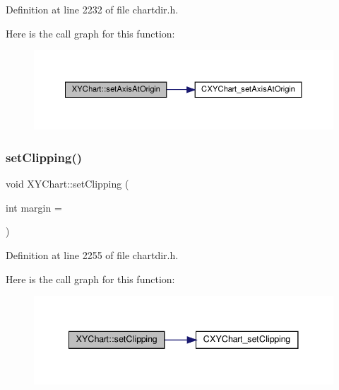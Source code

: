 Definition at line 2232 of file chartdir.\+h.

Here is the call graph for this function\+:
\nopagebreak
\begin{figure}[H]
\begin{center}
\leavevmode
\includegraphics[width=350pt]{class_x_y_chart_af108637af88e17464fbd2e675c03964f_cgraph}
\end{center}
\end{figure}
\mbox{\label{class_x_y_chart_a80c59b10a22fc74334a0e31945b05511}} 
\subsubsection{\texorpdfstring{set\+Clipping()}{setClipping()}}
{\footnotesize\ttfamily void X\+Y\+Chart\+::set\+Clipping (\begin{DoxyParamCaption}\item[{int}]{margin = {} }\end{DoxyParamCaption})\hspace{0.3cm}{\ttfamily [inline]}}



Definition at line 2255 of file chartdir.\+h.

Here is the call graph for this function\+:
\nopagebreak
\begin{figure}[H]
\begin{center}
\leavevmode
\includegraphics[width=341pt]{class_x_y_chart_a80c59b10a22fc74334a0e31945b05511_cgraph}
\end{center}
\end{figure}
\mbox{\label{class_x_y_chart_ae33eba813b2503538a2f359ed08d81a5}} 

